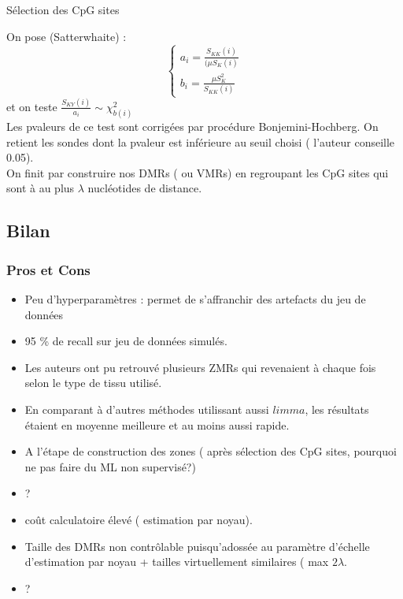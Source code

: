 \documentclass{beamer}
\begin{document}
\begin{frame}{Sélection des CpG sites}

On pose (Satterwhaite) :
\begin{equation}
\left\lbrace
\begin{array}{ccc}
a_{i} = \frac{S_{KK}(i)}{ (\mu S_{K}(i)} \\
b_{i} = \frac{\mu S^2_{K}}{S_{KK}(i)}
\end{array}\right.
\end{equation}
et on teste $\frac{S_{KY}(i)}{a_{i}} \sim \chi^2_{b(i)}$ \\
Les pvaleurs de ce test sont corrigées par procédure Bonjemini-Hochberg.  On retient les sondes dont la pvaleur est inférieure au seuil choisi ( l'auteur conseille 0.05). \\
On finit par construire nos DMRs ( ou VMRs) en regroupant les CpG sites qui sont à au plus $\lambda$ nucléotides de distance.
\end{frame}


\subsection{Bilan}
\begin{frame}
\frametitle{Pros et Cons}


\begin{itemize}
\color{green}
\item Peu d'hyperparamètres : permet de s'affranchir des artefacts du jeu de données
\item 95 \% de recall sur jeu de données simulés.
\item Les auteurs ont pu retrouvé plusieurs ZMRs qui revenaient à chaque fois selon le type de tissu utilisé.
\item En comparant à d'autres méthodes utilissant aussi $limma$, les résultats étaient en moyenne meilleure et au moins aussi rapide.
\item A l'étape de construction des zones ( après sélection des CpG sites, pourquoi ne pas faire du ML non supervisé?)
\item ?

\color{red}
\item coût calculatoire élevé ( estimation par noyau).
\item Taille des DMRs non contrôlable puisqu'adossée au paramètre d'échelle d'estimation par noyau + tailles virtuellement similaires ( max $2\lambda$.
\item ?
\end{itemize}
\end{frame}
\end{document}
